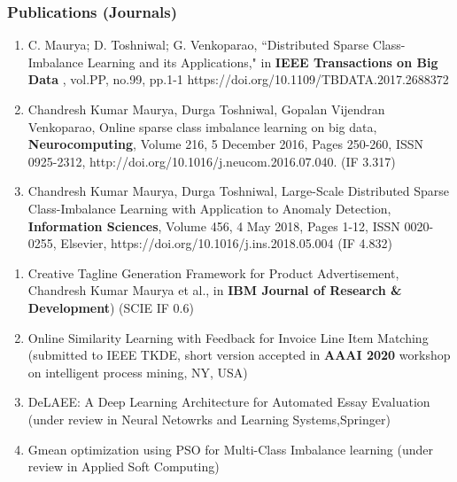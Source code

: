 \documentclass[blue]{beamer}
\begin{document}
\begin{frame}
\footnotesize
\frametitle{Publications (Journals)}

\begin{enumerate} 
\item 

C. Maurya; D. Toshniwal; G. Venkoparao, ``Distributed Sparse Class-Imbalance Learning and its Applications," in {\bf IEEE Transactions on Big Data} , vol.PP, no.99, pp.1-1
https://doi.org/10.1109/TBDATA.2017.2688372

\item
Chandresh Kumar Maurya, Durga Toshniwal, Gopalan Vijendran Venkoparao, Online sparse class imbalance learning on big data, {\bf Neurocomputing}, Volume 216, 5 December 2016, Pages 250-260, ISSN 0925-2312, http://doi.org/10.1016/j.neucom.2016.07.040. (IF 3.317)

\item 
Chandresh Kumar Maurya, Durga Toshniwal, Large-Scale Distributed Sparse Class-Imbalance Learning with Application to Anomaly Detection,  {\bf Information Sciences}, Volume 456, 4 May 2018, Pages 1-12, ISSN 0020-0255, Elsevier, https://doi.org/10.1016/j.ins.2018.05.004 (IF 4.832)


\end{enumerate}
\end{frame}

\begin{frame}
\begin{enumerate} 


\item   Creative Tagline Generation Framework for Product Advertisement, Chandresh Kumar Maurya et al.,  in {\bf IBM Journal of Research \& Development}) (SCIE IF 0.6)
\item  Online Similarity Learning with Feedback for Invoice Line Item Matching (submitted to IEEE TKDE, short version accepted in {\bf AAAI 2020} workshop on intelligent process mining, NY, USA)
\item DeLAEE: A Deep Learning Architecture for Automated Essay Evaluation (under review in Neural Netowrks and Learning Systems,Springer)
\item Gmean optimization using PSO for Multi-Class Imbalance learning (under review in Applied Soft Computing)
\end{enumerate}
\end{frame}
\end{document}
